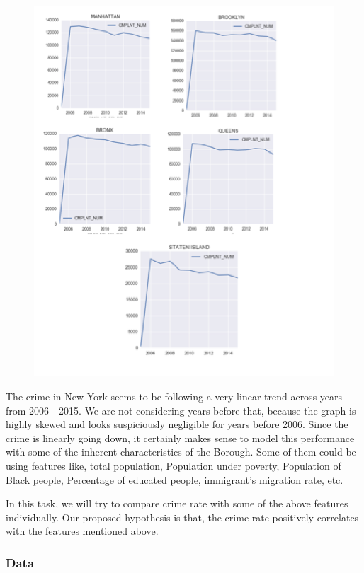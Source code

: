\documentclass{article}
\begin{document}
\begin{figure}[H]
\centering
\includegraphics[scale=1]{Akash1.png}
\end{figure}

The crime in New York seems to be following a very linear trend across years from 2006 - 2015. We are not considering years before that, because the graph is highly skewed and looks suspiciously negligible for years before 2006. Since the crime is linearly going down, it certainly makes sense to model this performance with some of the inherent characteristics of the Borough. Some of them could be using features like, total population, Population under poverty, Population of Black people, Percentage of educated people, immigrant’s migration rate, etc. 

In this task, we will try to compare crime rate with some of the above features individually. Our proposed hypothesis is that, the crime rate positively correlates with the features mentioned above.

\subsubsection{Data}
\end{document}
